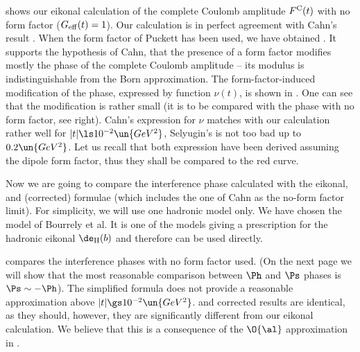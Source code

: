  shows our eikonal calculation of the complete Coulomb amplitude $F^{\rm C}(t)$ with no form factor ($G_{\rm eff}(t) = 1$). Our calculation is in perfect agreement with Cahn's result . When the form factor of Puckett has been used, we have obtained . It supports the hypothesis of Cahn, that the presence of a form factor modifies mostly the phase of the complete Coulomb amplitude -- its modulus is indistinguishable from the Born approximation. The form-factor-induced modification of the phase, expressed by function $\nu(t)$, is shown in . One can see that the modification is rather small (it is to be compared with the phase with no form factor, see  right). Cahn's expression for $\nu$ matches with our calculation rather well for $|t| \ls 10^{-2}\un{GeV^2}$, Selyugin's is not too bad up to $0.2\un{GeV^2}$. Let us recall that both expression have been derived assuming the dipole form factor, thus they shall be compared to the red curve.


\bmfig
{}
%
\emfig

Now we are going to compare the interference phase calculated with the eikonal, \WY{} and (corrected) \KL{} formulae (which includes the one of Cahn as the no-form factor limit). For simplicity, we will use one hadronic model only. We have chosen the model of Bourrely et al. It is one of the models giving a prescription for the hadronic eikonal $\de_{\rm H}(b)$ and therefore  can be used directly.

 compares the interference phases with no form factor used. (On the next page we will show that the most reasonable comparison between $\Ph$ and $\Ps$ phases is $\Ps \sim - \Ph$). The simplified \WY{} formula does not provide a reasonable approximation above $|t| \gs 10^{-2}\un{GeV^2}$. \WY{} and corrected \KL{} results are identical, as they should, however, they are significantly different from our eikonal calculation. We believe that this is a consequence of the $\O{\al}$ approximation in .

